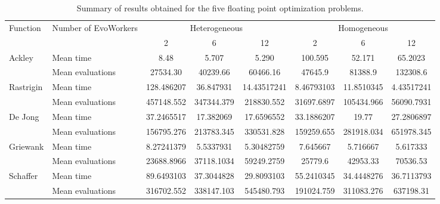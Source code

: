 \documentclass[conference]{IEEEtran}
\begin{document}
\begin{table}[t]
  \centering
  \caption{Summary of results obtained for the five floating point
      optimization problems. }
    \label{fig:summary}
    \begin{tabular}{|l|l|c|c|c|c|c|c|}
      \hline 
      \multirow{2}{*}{Function} & \multirow{2}{*}{Number of EvoWorkers} &  \multicolumn{3}{|c|}{Heterogeneous} & \multicolumn{3}{|c|}{Homogeneous}\\
      \cline{3-8}
                                & & 2 & 6 & 12 & 2 & 6 & 12\\
            \hline 
      \multirow{2}{*}{Ackley} & Mean time & 8.48& 5.707& 5.290 & 100.595 & 52.171 & 65.2023\\
      \cline{2-8}
                                & Mean evaluations & 27534.30 & 40239.66 & 60466.16 & 47645.9 & 81388.9 & 132308.6 \\
      \hline 
      \multirow{2}{*}{Rastrigin} & Mean time &  128.486207 & 36.847931 & 14.43517241 & 8.46793103 & 11.8510345 &  4.43517241 \\
      \cline{2-8} 
                                & Mean evaluations & 457148.552 & 347344.379 & 218830.552 & 31697.6897 & 105434.966 & 56090.7931 \\
      \hline
      \multirow{2}{*}{De Jong} & Mean time & 37.2465517 & 17.382069 & 17.6596552 & 33.1886207 & 19.77 & 27.2806897 \\
      \hline
                                & Mean evaluations & 156795.276 & 213783.345 & 330531.828 & 159259.655 & 281918.034 & 651978.345 \\
      \hline
      \multirow{2}{*}{Griewank} & Mean time & 8.27241379 & 5.5337931 & 5.30482759 & 7.645667 & 5.716667 & 5.617333 \\
            \hline

                                & Mean evaluations & 23688.8966 & 37118.1034 & 59249.2759 & 25779.6 & 42953.33 & 70536.53 \\
            \hline

      \multirow{2}{*}{Schaffer} & Mean time &  89.6493103 & 37.3044828 & 29.8093103 & 55.2410345 & 34.4448276 & 36.7113793 \\
            \hline

                                & Mean evaluations & 316702.552  & 338147.103 & 545480.793 & 191024.759 & 311083.276 & 637198.31 \\
            \hline

       \end{tabular}

\end{table}
\end{document}
